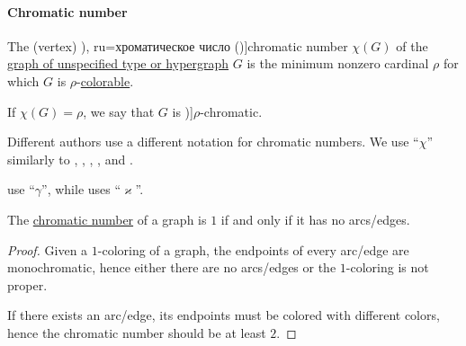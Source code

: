 \paragraph{Chromatic number}

\begin{definition}\label{def:graph_chromatic_number}
  The (vertex) \term[bg=хроматично число (\cite[142]{Мирчев2001Графи}), ru=хроматическое число (\cite[235]{ЕмеличевИПр1990ТеорияГрафов})]{chromatic number} \( \chi(G) \) of the \hyperref[rem:graph_of_unspecified_type]{graph of unspecified type or hypergraph} \( G \) is the minimum nonzero cardinal \( \rho \) for which \( G \) is \( \rho \)-\hyperref[def:graph_coloring/colorable]{colorable}.

  If \( \chi(G) = \rho \), we say that \( G \) is \term[ru=\( \rho \)-хроматический (граф) (\cite[236]{ЕмеличевИПр1990ТеорияГрафов})]{\( \rho \)-chromatic}.
\end{definition}
\begin{comments}
  \item Different authors use a different notation for chromatic numbers. We use \enquote{\( \chi \)} similarly to
  \cite[119]{Diestel2017GraphTheory},
  \cite[145]{Bollobás1998ModernGraphTheory},
  \cite[152]{Knauer2019AlgebraicGraphTheory},
  \cite[def. 10.8.2]{Rosen2019DiscreteMathematics},
  \cite[235]{ЕмеличевИПр1990ТеорияГрафов} and
  \cite[374]{Новиков2013ДискретнаяМатематика}.

  \Textcite[28]{GondranMinoux1984GraphsAndAlgorithms} use \enquote{\( \gamma \)}, while \textcite[142]{Мирчев2001Графи} uses \enquote{\( \varkappa \)}.
\end{comments}

\begin{proposition}\label{thm:chromatic_number_edgeless}
  The \hyperref[def:graph_chromatic_number]{chromatic number} of a graph is \( 1 \) if and only if it has no arcs/edges.
\end{proposition}
\begin{proof}
  \SufficiencySubProof Given a \( 1 \)-coloring of a graph, the endpoints of every arc/edge are monochromatic, hence either there are no arcs/edges or the \( 1 \)-coloring is not proper.

  \NecessitySubProof If there exists an arc/edge, its endpoints must be colored with different colors, hence the chromatic number should be at least \( 2 \).
\end{proof}

